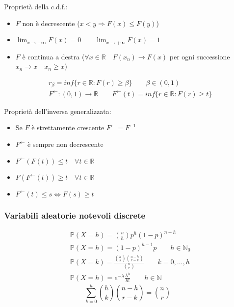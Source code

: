 \begin{proposition}
	Proprietà della c.d.f.:
	\begin{itemize}
		\item $F$ non è decrescente ($x < y \Rightarrow F(x) \leq F(y)$)
		\item $\lim_{x \to - \infty} F(x) = 0 \quad\quad \lim_{x \to + \infty}F(x)  = 1$
		\item $F$ è continua a destra ($\forall x \in \mathbb{R} \quad F(x_n) \to F(x)$ per ogni successione $x_n \to x \quad x_n \geq x$)
	\end{itemize}
\end{proposition}

\begin{align}
	& r_\beta = inf\{r \in \mathbb{R} : F(r) \geq \beta\} \quad\quad \beta \in (0,1) \tag{$\beta$-quantile} \\
	& F^{\leftarrow} : (0,1) \to \mathbb{R} \quad\quad F^{\leftarrow}(t)=inf\{r \in \mathbb{R} : F(r) \geq t\} \tag{Inversa generalizzata}
\end{align}
\begin{proposition}
	Proprietà dell'inversa generalizzata:
	\begin{itemize}
		\item Se $F$ è strettamente crescente $F^{\leftarrow}=F^{-1}$
		\item $F^{\leftarrow}$ è sempre non decrescente
		\item $F^\leftarrow(F(t)) \leq t \quad \forall t \in \mathbb{R}$
		\item $F(F^\leftarrow(t)) \geq t \quad \forall t \in \mathbb{R}$
		\item $F^\leftarrow(t) \leq s \Leftrightarrow F(s) \geq t$
	\end{itemize}
\end{proposition}

\subsubsection{Variabili aleatorie notevoli discrete}
\begin{align}
	& \mathbb{P}(X=h) = \binom{n}{h}p^h(1-p)^{n-h} \tag{Binomiale $B(n,p)$} \\
	& \mathbb{P}(X=h) = (1-p)^{h-1}p\quad\quad h \in \mathbb{N}_0 \tag{Geometriche $G(p)$} \\
	& \mathbb{P}(X = k) = \frac{\binom{h}{k} \binom{n-h}{r-k}}{\binom{n}{r}} \quad\quad k=0,\ldots, h \tag{Ipergeometriche $I(n,h,r)$} \\
	& \mathbb{P}(X=h)=e^{-\lambda}\frac{\lambda^h}{h!} \quad\quad h \in \mathbb{N} \tag{Poisson $P(\lambda)$}
\end{align}
\begin{equation}
	\sum_{k=0}^{h} \binom{h}{k}\binom{n-h}{r-k} = \binom{n}{r} \tag{Identità di Vandermonde} 
\end{equation}


